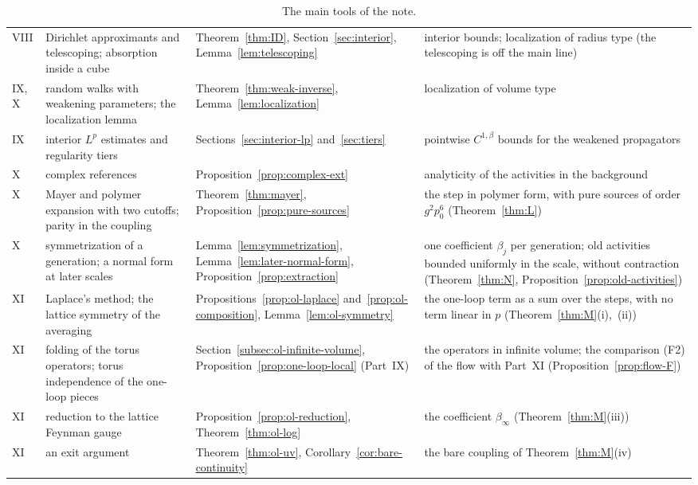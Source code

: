 \begin{table}[tbp]
\begin{tabular}{|p{}|p{}|p{}|p{}|}
VIII & \raggedright Dirichlet approximants and telescoping; absorption inside a cube & \raggedright Theorem~\ref{thm:ID}, Section~\ref{sec:interior}, Lemma~\ref{lem:telescoping} & \raggedright interior bounds; localization of radius type (the telescoping is off the main line)\tabularnewline
IX, X & \raggedright random walks with weakening parameters; the localization lemma & \raggedright Theorem~\ref{thm:weak-inverse}, Lemma~\ref{lem:localization} & \raggedright localization of volume type\tabularnewline
IX & \raggedright interior $L^p$ estimates and regularity tiers & \raggedright Sections~\ref{sec:interior-lp} and~\ref{sec:tiers} & \raggedright pointwise $C^{1,\beta}$ bounds for the weakened propagators\tabularnewline
X & \raggedright complex references & \raggedright Proposition~\ref{prop:complex-ext} & \raggedright analyticity of the activities in the background\tabularnewline
X & \raggedright Mayer and polymer expansion with two cutoffs; parity in the coupling & \raggedright Theorem~\ref{thm:mayer}, Proposition~\ref{prop:pure-sources} & \raggedright the step in polymer form, with pure sources of order $g^2p_0^6$ (Theorem~\ref{thm:L})\tabularnewline
X & \raggedright symmetrization of a generation; a normal form at later scales & \raggedright Lemma~\ref{lem:symmetrization}, Lemma~\ref{lem:later-normal-form}, Proposition~\ref{prop:extraction} & \raggedright one coefficient $\beta_j$ per generation; old activities bounded uniformly in the scale, without contraction (Theorem~\ref{thm:N}, Proposition~\ref{prop:old-activities})\tabularnewline
XI & \raggedright Laplace's method; the lattice symmetry of the averaging & \raggedright Propositions~\ref{prop:ol-laplace} and~\ref{prop:ol-composition}, Lemma~\ref{lem:ol-symmetry} & \raggedright the one-loop term as a sum over the steps, with no term linear in $p$ (Theorem~\ref{thm:M}(i),~(ii))\tabularnewline
XI & \raggedright folding of the torus operators; torus independence of the one-loop pieces & \raggedright Section~\ref{subsec:ol-infinite-volume}, Proposition~\ref{prop:one-loop-local} (Part~IX) & \raggedright the operators in infinite volume; the comparison (F2) of the flow with Part~XI (Proposition~\ref{prop:flow-F})\tabularnewline
XI & \raggedright reduction to the lattice Feynman gauge & \raggedright Proposition~\ref{prop:ol-reduction}, Theorem~\ref{thm:ol-log} & \raggedright the coefficient $\beta_\infty$ (Theorem~\ref{thm:M}(iii))\tabularnewline
XI & \raggedright an exit argument & \raggedright Theorem~\ref{thm:ol-uv}, Corollary~\ref{cor:bare-continuity} & \raggedright the bare coupling of Theorem~\ref{thm:M}(iv)\tabularnewline
\hline
\end{tabular}
\caption{The main tools of the note.}\label{tab:tools}
\end{table}

